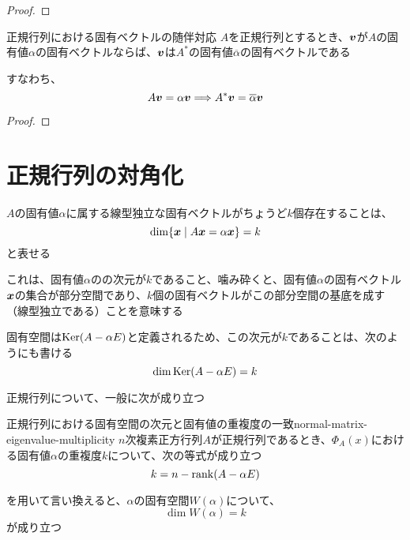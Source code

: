 \documentclass[../../../topic_linear-algebra]{subfiles}
\begin{document}
\begin{proof}
\end{proof}

\br

\begin{theorem*}{正規行列における固有ベクトルの随伴対応}
  $A$を正規行列とするとき、$\vb*{v}$が$A$の固有値$\alpha$の固有ベクトルならば、$\vb*{v}$は$A^*$の固有値$\overline{\alpha}$の固有ベクトルである

  すなわち、
  \begin{equation*}
    A\vb*{v} = \alpha \vb*{v} \Longrightarrow A^*\vb*{v} = \overline{\alpha} \vb*{v}
  \end{equation*}
\end{theorem*}

\begin{proof}
\end{proof}

\sectionline
\section{正規行列の対角化}

$A$の固有値$\alpha$に属する線型独立な固有ベクトルがちょうど$k$個存在することは、
\begin{equation*}
  \dim \{\vb*{x} \mid A\vb*{x} = \alpha \vb*{x} \} = k
\end{equation*}
と表せる

これは、固有値$\alpha$のの次元が$k$であること、噛み砕くと、固有値$\alpha$の固有ベクトル$\vb*{x}$の集合が部分空間であり、$k$個の固有ベクトルがこの部分空間の基底を成す（線型独立である）ことを意味する

\br

固有空間は$\operatorname{Ker}(A - \alpha E)$と定義されるため、この次元が$k$であることは、次のようにも書ける
\begin{equation*}
  \dim \operatorname{Ker}(A - \alpha E) = k
\end{equation*}

\br

正規行列について、一般に次が成り立つ

\begin{theorem}{正規行列における固有空間の次元と固有値の重複度の一致}{normal-matrix-eigenvalue-multiplicity}
  $n$次複素正方行列$A$が正規行列であるとき、$\Phi_A(x)$における固有値$\alpha$の重複度$k$について、次の等式が成り立つ
  \begin{equation*}
    k = n - \rank(A - \alpha E)
  \end{equation*}

  を用いて言い換えると、$\alpha$の固有空間$W(\alpha)$について、
  \begin{equation*}
    \dim W(\alpha) = k
  \end{equation*}
  が成り立つ
\end{theorem}
\end{document}
